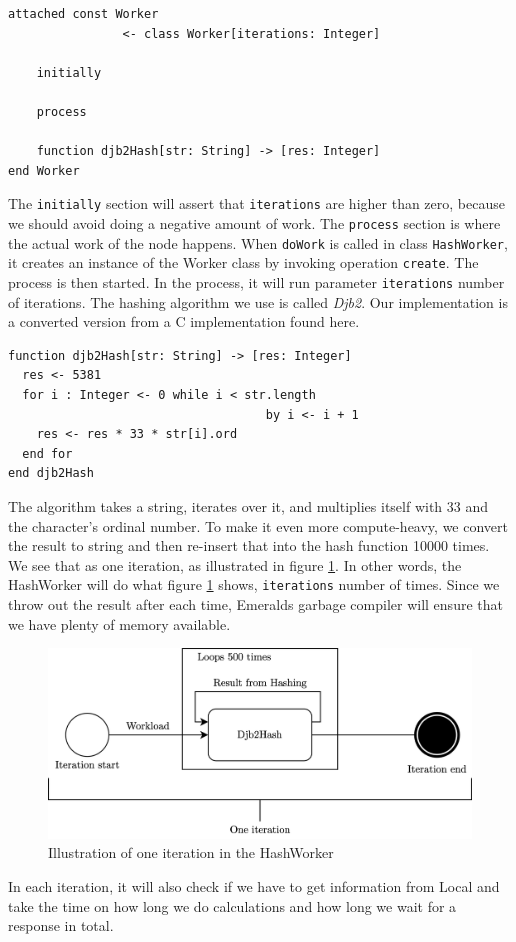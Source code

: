 \begin{minipage}{\linewidth}
\begin{lstlisting}[language=emerald]
attached const Worker 
                <- class Worker[iterations: Integer]
                
    initially
    
    process
    
    function djb2Hash[str: String] -> [res: Integer]
end Worker
\end{lstlisting}
\end{minipage}
The \verb|initially| section will assert that \verb|iterations| are higher than zero, because we should avoid doing a negative amount of work. The \verb|process| section is where the actual work of the node happens. When \verb|doWork| is called in class \verb|HashWorker|, it creates an instance of the Worker class by invoking operation \verb|create|. The process is then started. In the process, it will run parameter \verb|iterations| number of iterations. The hashing algorithm we use is called \textit{Djb2}. Our implementation is a converted version from a C implementation found here\cite{noauthor_hash_nodate}. 
\begin{lstlisting}[language=emerald]
function djb2Hash[str: String] -> [res: Integer]
  res <- 5381
  for i : Integer <- 0 while i < str.length 
                                    by i <- i + 1
    res <- res * 33 * str[i].ord
  end for
end djb2Hash
\end{lstlisting}
The algorithm takes a string, iterates over it, and multiplies itself with 33 and the character's ordinal number. To make it even more compute-heavy, we convert the result to string and then re-insert that into the hash function 10000 times. We see that as one iteration, as illustrated in figure \ref{fig:Hashing_algorithm_iteration}. In other words, the HashWorker will do what figure \ref{fig:Hashing_algorithm_iteration} shows, \verb|iterations| number of times. Since we throw out the result after each time, Emeralds garbage compiler will ensure that we have plenty of memory available. 
\begin{figure}[t]
    \centering
    \includegraphics[scale=0.9]{chapters/5_implementation/figures/Iteration.png}
    \caption{Illustration of one iteration in the HashWorker}
    \label{fig:Hashing_algorithm_iteration}
\end{figure}
In each iteration, it will also check if we have to get information from Local and take the time on how long we do calculations and how long we wait for a response in total.


